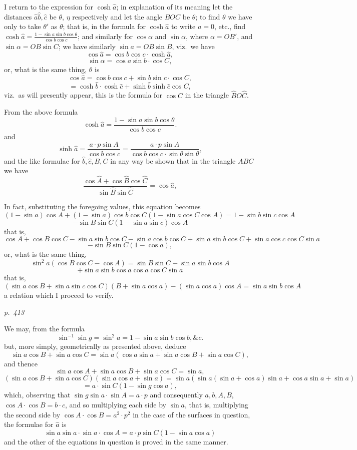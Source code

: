 \documentclass[11pt,a4paper]{book}
\begin{document}
\noindent
I return to the expression for $\cosh \hat{a}$; in explanation of its meaning let the
distances $\hat{a} \hat{b}, \hat{c}$ be $\theta$, $\eta$ respectively and let the angle $BOC$ be $\theta$; to find $\theta$ we
have only to take $\theta'$ as $\theta$; that is, in the formula for $\cosh \hat{a}$ to write $a = 0$, etc.,
find $\cosh \hat{a} = \frac{1 - \sin a \sin b \cos \theta}{\cos b \cos c}$; and similarly for $\cos \alpha$ and $\sin \alpha$, where
$\alpha = O B'$, and  $\sin \alpha = O B \sin C $; we have similarly $\sin a = O B \sin B$, viz.\ we have
\[
\cos \hat{a} = \cos b \cos c \cdot \cosh \hat{a},
\]
\[
\sin \alpha = \cos a \sin b \cdot \cos C,
\]
or, what is the same thing, $\theta$ is
\[
\cos \hat{a} = \cos b \cos c + \sin b \sin c \cdot \cos C,
\]
\[
= \cosh \hat{b} \cdot \cosh \hat{c} + \sinh \hat{b} \sinh \hat{c} \cos C,
\]
viz.\ as will presently appear, this is the formula for $\cos C$ in the triangle $\hat{B} O \hat{C}$.

From the above formula
\[
\cosh \hat{a} = \frac{1 - \sin a \sin b \cos \theta}{\cos b \cos c}.
\]
and
\[
\sinh \hat{a} = \frac{a \cdot p \sin A}{\cos b \cos c} = \frac{a \cdot p \sin A}{\cos b \cos c \cdot \sin \theta \sin \theta},
\]
and the like formulae for $\hat{b}, \hat{c}, B, C$ in any way be shown that in the triangle $ABC$ we have
\[
\frac{\cos \hat{A} + \cos \hat{B} \cos \hat{C}}{\sin \hat{B} \sin \hat{C}} = \cos \hat{a},
\]

In fact, substituting the foregoing values, this equation becomes
\[
(1 - \sin a) \cos A + (1 - \sin a) \cos b \cos C (1 - \sin a \cos C \cos A) = 1 - \sin b \sin c \cos A
\]
\[
- \sin B \sin C (1 - \sin a \sin c) \cos A
\]
that is,
\[
\cos A + \cos B \cos C - \sin a \sin b \cos C - \sin a \cos b \cos C + \sin a \sin b \cos C + \sin a \cos c \cos C \sin a
\]
\[
- \sin B \sin C (1 - \cos a),
\]
or, what is the same thing,
\[
\sin^2 a (\cos B \cos C - \cos A) = \sin B \sin C + \sin a \sin b \cos A
\]
\[
+ \sin a \sin b \cos a \cos a \cos C \sin a
\]
that is,
\[
(\sin a \cos B + \sin a \sin c \cos C) (B + \sin a \cos a) - (\sin a \cos a) \cos A = \sin a \sin b \cos A
\]
a relation which I proceed to verify.

\clearpage

\bigskip
\textit{p.~413}
\smallskip

\noindent
We may, from the formula
\[
\sin^{-1} \sin g = \sin^2 a = 1 - \sin a \sin b \cos b, \&c.
\]
but, more simply, geometrically as presented above, deduce
\[
\sin a \cos B + \sin a \cos C = \sin a (\cos a \sin a + \sin a \cos B + \sin a \cos C),
\]
and thence
\[
\sin a \cos A + \sin a \cos B + \sin a \cos C = \sin a,
\]
\[
(\sin a \cos B + \sin a \cos C)(\sin a \cos a + \sin a) = \sin a (\sin a (\sin a + \cos a) \sin a + \cos a \sin a + \sin a)
\]
\[
= a \cdot \sin C (1 - \sin g \cos a),
\]
which, observing that $\sin g \sin a \cdot \sin A = a \cdot p$ and consequently $a, b, A, B$,
$\cos A \cdot \cos B = b \cdot c$, and so multiplying each side by $\sin a$, that is, multiplying
the second side by $\cos A \cdot \cos B = a^2 \cdot p^2$ in the case of the surfaces in question, the formulae for $\hat{a}$ is
\[
\sin a \sin a \cdot \sin a \cdot \cos A = a \cdot p \sin C (1 - \sin a \cos a)
\]
and the other of the equations in question is proved in the same manner.
\end{document}
